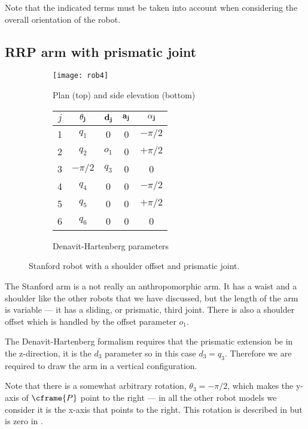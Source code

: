 \documentclass[11pt]{article}
\numberwithin{equation}{section}
\begin{document}
Note that the indicated terms must be taken into account when considering the overall orientation of the robot.
\pagebreak

\subsection{RRP arm with prismatic joint}

	\begin{figure}[h]
	\centering
	\begin{subfigure}[b]{0.6\textwidth}
	\centering
		\texttt{[image: rob4]}
		\caption{Plan (top) and side elevation (bottom)}
	\label{fig:rob4} 
	\end{subfigure}
	\begin{subfigure}[b]{0.3\textwidth}
		\begin{tabular}{|c|c|c|c|c|} \hline
			$j$ & $\bf \theta_j$ & $\bf d_j$ & $\bf a_j$ & $\bf \alpha_j$ \\ \hline
			\rowcolor{SkyBlue}1 &  $q_1$ & \cellcolor{White} 0 &  0 & $-\pi/2$ \\
			\rowcolor{SkyBlue}2 &  $q_2$ & $o_1$ & 0& $+\pi/2$ \\
			\rowcolor{SkyBlue}3 & $-\pi/2$ & $q_3$ & 0  & 0 \\
			\rowcolor{Peach}4 &  $q_4$ & 0  & 0 & $-\pi/2$  \\
			\rowcolor{Peach}5 &$q_5$ & 0 & 0 & $+\pi/2$ \\
			\cellcolor{Peach} 6 & \cellcolor{Peach} $q_6$ & 0 & 0 & 0 \\ \hline
		\end{tabular}
		\caption{Denavit-Hartenberg parameters\cite{Paul81a,Paul72}}
		\label{fig:dh4}
	\end{subfigure}
	\caption{Stanford  robot with a shoulder offset and prismatic joint.}
	\end{figure}

The Stanford arm is a not really an anthropomorphic arm.  It has a waist and a shoulder like the other robots that we have discussed, but the
length of the arm is variable --- it has a  sliding, or prismatic, third joint.  There is also a shoulder offset which is
handled by the offset parameter $o_1$.

The Denavit-Hartenberg formalism requires that the prismatic extension  be in the z-direction, it is the $d_3$ parameter so in this case
$d_3 = q_3$.
Therefore we are required to draw the arm in a vertical configuration.

Note that there is a somewhat arbitrary rotation, $\theta_3 = -\pi/2$, which makes the y-axis of $\cframe{P}$ point to the right --- in all the other robot models
we consider it is the x-axis that points to the right.  This rotation is described in \cite{Paul72} but is zero in \cite{Paul81a}.
\end{document}
